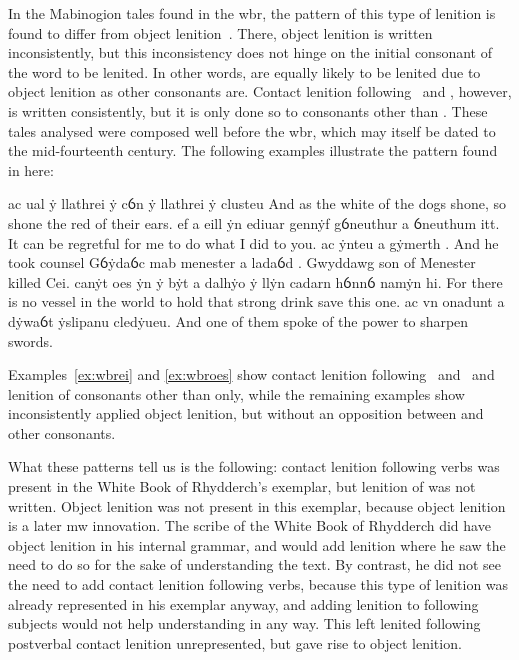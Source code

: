 In the Mabinogion tales found in the \gls{wbr}, the pattern of this type of lenition is found to differ from object lenition~\autocite[42, 69--70]{van_development14}. There, object lenition is written inconsistently, but this inconsistency does not hinge on the initial consonant of the word to be lenited. In other words,  are equally likely to be lenited due to object lenition as other consonants are. Contact lenition following \ei\ and \oes, however, is written consistently, but it is only done so to consonants other than . These tales analysed were composed well before the \gls{wbr}, which may itself be dated to the mid-fourteenth century. The following examples illustrate the pattern found in here:
\begin{mwl}
  {ac ual ẏ llathrei  ẏ cỽn ẏ llathrei  ẏ clusteu}%
  {And as the white of the dogs shone, so shone the red of their ears.}%
  {ef a eill  ẏn ediuar gennẏf gỽneuthur a ỽneuthum itt.}%
  {It can be regretful for me to do what I did to you.}
  {ac ẏnteu a gẏmerth .}%
  {And he took counsel}
  {Gỽẏdaỽc mab menester a ladaỽd .}%
  {Gwyddawg son of Menester killed Cei.}
  {canẏt oes  ẏn ẏ bẏt a dalhẏo ẏ llẏn cadarn hỽnnỽ namẏn hi.}%
  {For there is no vessel in the world to hold that strong drink save this one.}%
  {ac vn onadunt a dẏwaỽt  ẏslipanu cledẏueu.}%
  {And one of them spoke of the power to sharpen swords.}
\end{mwl}
Examples~\ref{ex:wbrei} and \ref{ex:wbroes} show contact lenition following \ei\ and \oes\ and lenition of consonants other than  only, while the remaining examples show inconsistently applied object lenition, but without an opposition between  and other consonants.

What these patterns tell us is the following: contact lenition following verbs was present in the White Book of Rhydderch's exemplar, but lenition of  was not written. Object lenition was not present in this exemplar, because object lenition is a later \gls{mw} innovation. The scribe of the White Book of Rhydderch did have object lenition in his internal grammar, and would add lenition where he saw the need to do so for the sake of understanding the text. By contrast, he did not see the need to add contact lenition following verbs, because this type of lenition was already represented in his exemplar anyway, and adding lenition to following subjects would not help understanding in any way. This left lenited  following postverbal contact lenition unrepresented, but gave rise to object lenition.

